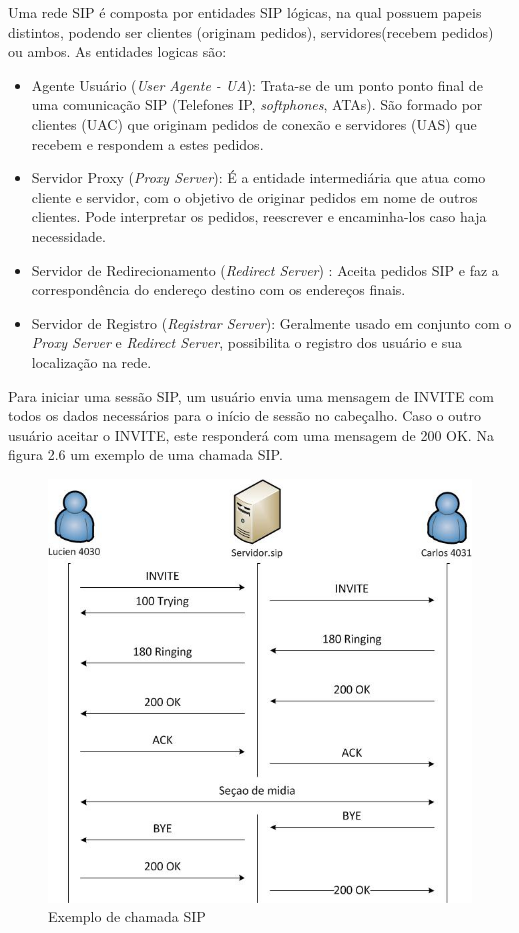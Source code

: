 \documentclass[12pt,a4paper,oneside]{report}
\begin{document}
Uma rede SIP é composta por entidades SIP lógicas, na qual possuem papeis distintos, podendo ser clientes (originam pedidos), servidores(recebem pedidos) ou ambos. As entidades logicas são: 

\begin{itemize}
  \item Agente Usuário (\textit{User Agente - UA}): Trata-se de um ponto ponto final de uma comunicação SIP (Telefones IP, \textit{softphones}, ATAs). São formado por clientes (UAC) que originam pedidos de conexão e servidores (UAS) que recebem e respondem a estes pedidos. 
  \item Servidor Proxy (\textit{Proxy Server}): É a entidade intermediária que atua como cliente e servidor, com o objetivo de originar pedidos em nome de outros clientes. Pode interpretar os pedidos, reescrever e encaminha-los caso haja necessidade.
  \item Servidor de Redirecionamento (\textit{Redirect Server}) : Aceita pedidos SIP e faz a correspondência do endereço destino com os endereços finais. 
  \item Servidor de Registro (\textit{Registrar Server}): Geralmente usado em conjunto com o \textit{Proxy Server} e \textit{Redirect Server}, possibilita o registro dos usuário e sua localização na rede.
\end{itemize}

Para iniciar uma sessão SIP, um usuário envia uma mensagem de INVITE com todos os dados necessários para o início de sessão no cabeçalho. Caso o outro usuário aceitar o INVITE, este responderá com uma mensagem de 200 OK. Na figura 2.6 um exemplo de uma chamada SIP. 

\begin{figure}[!htdb]
 \centering
  \includegraphics[width = 0.8\linewidth]{images/chamadaSIP}
  \caption{Exemplo de chamada SIP} %
  \label{f_mediaStream}
\end{figure}
\end{document}

